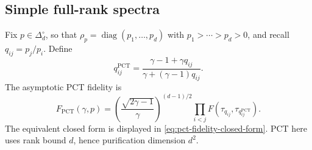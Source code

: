 \documentclass[11pt]{article}
\theoremstyle{remark}
\theoremstyle{plain}
\newcommand{\diag}{\operatorname{diag}}
\begin{document}
\subsection{Simple full-rank spectra}
\label{app:pct-full-rank}

Fix \(p\in\Delta_d^\circ\), so that
\(\rho_p=\diag(p_1,\ldots,p_d)\) with
\(p_1>\cdots>p_d>0\), and recall \(q_{ij}=p_j/p_i\).  Define
\begin{equation}\label{eq:q-pct}
  q_{ij}^{\mathrm{PCT}}
  =\frac{\gamma-1+\gamma q_{ij}}
         {\gamma+(\gamma-1)q_{ij}}.
\end{equation}
The asymptotic PCT fidelity is
\begin{equation}\label{eq:pct-fidelity}
  F_{\mathrm{PCT}}(\gamma,p)
  =\left(\frac{\sqrt{2\gamma-1}}{\gamma}\right)^{(d-1)/2}
   \prod_{i<j}F\!\left(\tau_{q_{ij}},
                       \tau_{q_{ij}^{\mathrm{PCT}}}\right).
\end{equation}
The equivalent closed form is displayed in
\eqref{eq:pct-fidelity-closed-form}.
PCT here uses rank bound \(d\), hence purification dimension \(d^2\).
\end{document}
